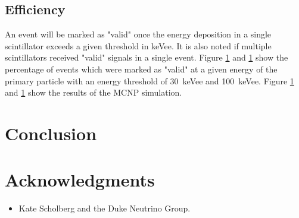 \documentclass[12pt]{article}
\begin{document}
\subsection{Efficiency}

An event will be marked as "valid" once the energy deposition in a single scintillator exceeds a given threshold in keVee. It is also noted if multiple scintillators received "valid" signals in a single event. Figure \ref{} and \ref{} show the percentage of events which were marked as "valid" at a given energy of the primary particle with an energy threshold of \SI{30}{keVee} and \SI{100}{keVee}. Figure \ref{} and \ref{} show the results of the MCNP simulation.







\section{Conclusion}


\section*{Acknowledgments}
\begin{itemize}
  \item[] Kate Scholberg and the Duke Neutrino Group.
\end{itemize}



\end{document}
